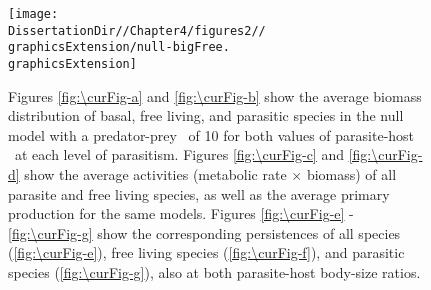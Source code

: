 \documentclass[/home/nkappler/Research/Dissertation/dissertation.tex]{subfiles}
\begin{document}
\begin{bibunit}
\begin{figure} 
    \texttt{[image: \\DissertationDir//Chapter4/figures2//\\graphicsExtension/null-bigFree.\\graphicsExtension]}%
    {%
     }%
     \caption[Dynamic results, null model, large free livers]{Figures \ref{fig:\curFig-a} and \ref{fig:\curFig-b} show 
        the average biomass distribution of basal, free living, and parasitic
        species in the null model with a predator-prey \aBSR~of 10 for both
        values of parasite-host \BSR~at each level of parasitism. Figures
        \ref{fig:\curFig-c} and \ref{fig:\curFig-d} show the average activities
        (metabolic rate $\times$ biomass) of all parasite and free living
        species, as well as the average primary production for the same models.
        Figures \ref{fig:\curFig-e} - \ref{fig:\curFig-g} show the
        corresponding persistences of all species (\ref{fig:\curFig-e}),
        free living species (\ref{fig:\curFig-f}), and parasitic species
        (\ref{fig:\curFig-g}), also at both parasite-host body-size
        ratios.\label{fig:null-bigFree}} 
\end{figure}




\edef\bigBioFracBioDecFree{\pgfmathresult}

\edef\smallBioFracBioDecFree{\pgfmathresult}

 \edef\bigBioPerDelPara{\pgfmathresult}

 \edef\smallBioPerDelPara{\pgfmathresult}


\end{bibunit}
\end{document}
